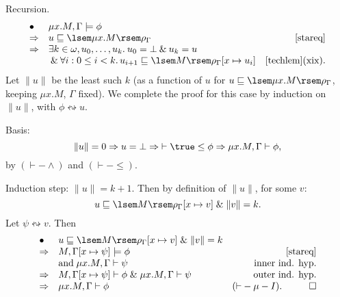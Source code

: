 Recursion.
\[ \begin{array}{llr}
\bullet & \mu x. M, \Gamma \models \phi & \\
\Rightarrow & u \sqsubseteq \lsem \mu x. M \rsem \rho_{\Gamma} & \ref{stareq} \\
\Rightarrow & \exists k \in \omega , u_{0}, \ldots , u_{k}. \: u_{0} = \bot \: \& \: u_{k} = u & \\
& \: \& \: \forall i: 0 \leq i < k. \, u_{i+1} \sqsubseteq \lsem M \rsem \rho_{\Gamma} [x \mapsto u_{i}]  & \mbox{\ref{techlem}(xix).}
\end{array} \]
Let $\| u \|$ be the least such $k$ (as a function of $u$ for $u \sqsubseteq \lsem \mu x. M \rsem \rho_{\Gamma}$, keeping $\mu x. M$, $\Gamma$ fixed).
We complete the proof for this case by induction on $\| u \|$, with $\phi \leftrightsquigarrow u$.

Basis:
\[ \| u \| = 0 \Rightarrow u = \bot \Rightarrow \; \vdash \true \leq \phi \Rightarrow \mu x. M, \Gamma \vdash \phi , \]
by $({\vdash}-{\wedge})$ and $({\vdash}-{\leq})$.

Induction step: $\| u \| = k+1$. Then by definition of $\| u \|$, for some $v$:
\[ u \sqsubseteq \lsem M \rsem \rho_{\Gamma} [x \mapsto v] \; \& \; \| v \| = k. \]
Let $\psi \leftrightsquigarrow v$. Then
\[ \begin{array}{llr}
\bullet & u \sqsubseteq \lsem M \rsem \rho_{\Gamma} [x \mapsto v] \; \& \; \| v \| = k & \\
\Rightarrow & M, \Gamma [x \mapsto \psi ] \models \phi & \ref{stareq} \\
& \mbox{and} \; \mu x. M, \Gamma \vdash \psi & \mbox{inner ind. hyp.} \\
\Rightarrow & M, \Gamma [x \mapsto \psi ] \vdash \phi \; \& \; \mu x. M, \Gamma \vdash \psi & \mbox{outer ind. hyp.} \\
\Rightarrow & \mu x. M, \Gamma \vdash \phi & ({\vdash}-{\mu}-I). \;\;\; \qed
\end{array} \]

